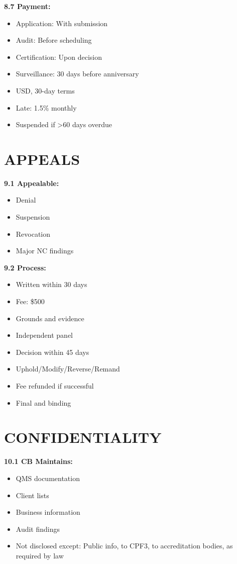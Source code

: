 \documentclass[11pt,a4paper]{article}
\begin{document}
\textbf{8.7 Payment:}
\begin{itemize}
\item Application: With submission
\item Audit: Before scheduling
\item Certification: Upon decision
\item Surveillance: 30 days before anniversary
\item USD, 30-day terms
\item Late: 1.5\% monthly
\item Suspended if >60 days overdue
\end{itemize}

\section{APPEALS}

\textbf{9.1 Appealable:}
\begin{itemize}
\item Denial
\item Suspension
\item Revocation
\item Major NC findings
\end{itemize}

\textbf{9.2 Process:}
\begin{itemize}
\item Written within 30 days
\item Fee: \$500
\item Grounds and evidence
\item Independent panel
\item Decision within 45 days
\item Uphold/Modify/Reverse/Remand
\item Fee refunded if successful
\item Final and binding
\end{itemize}

\section{CONFIDENTIALITY}

\textbf{10.1 CB Maintains:}
\begin{itemize}
\item QMS documentation
\item Client lists
\item Business information
\item Audit findings
\item Not disclosed except: Public info, to CPF3, to accreditation bodies, as required by law
\end{itemize}
\end{document}
